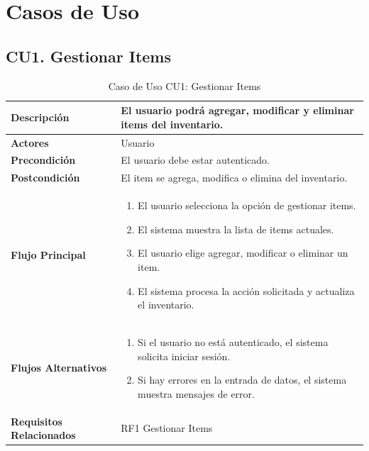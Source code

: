 \documentclass{article}
\begin{document}
\newpage

\section{Casos de Uso}

\subsection{CU1. Gestionar Items}
\begin{table}[H]
    \centering
    \begin{tabular}{|l|p{10cm}|}
        \hline
        \textbf{Descripción} & El usuario podrá agregar, modificar y eliminar items del inventario. \\ \hline
        \textbf{Actores} & Usuario \\ \hline
        \textbf{Precondición} & El usuario debe estar autenticado. \\ \hline
        \textbf{Postcondición} & El item se agrega, modifica o elimina del inventario. \\ \hline
        \textbf{Flujo Principal} & 
        \begin{enumerate}
            \item El usuario selecciona la opción de gestionar items.
            \item El sistema muestra la lista de items actuales.
            \item El usuario elige agregar, modificar o eliminar un item.
            \item El sistema procesa la acción solicitada y actualiza el inventario.
        \end{enumerate} \\ \hline
        \textbf{Flujos Alternativos} & 
        \begin{enumerate}
            \item Si el usuario no está autenticado, el sistema solicita iniciar sesión.
            \item Si hay errores en la entrada de datos, el sistema muestra mensajes de error.
        \end{enumerate} \\ \hline
        \textbf{Requisitos Relacionados} & RF1 Gestionar Items \\ \hline
    \end{tabular}
    \caption{Caso de Uso CU1: Gestionar Items}
\end{table}
\end{document}
